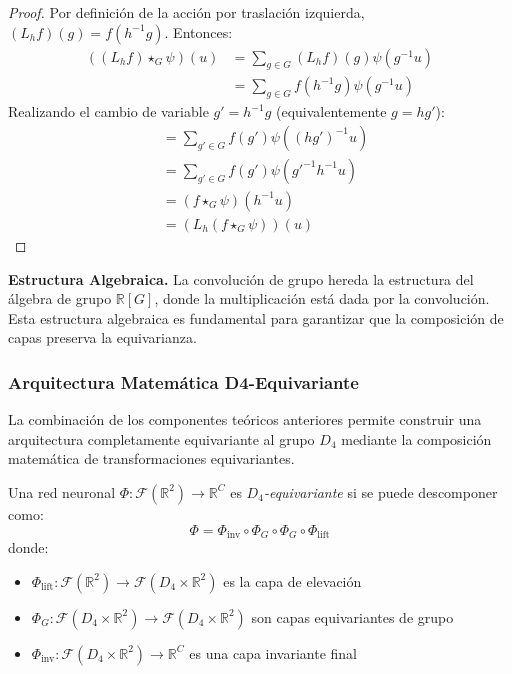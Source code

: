 \begin{proof}
Por definición de la acción por traslación izquierda, $(L_h f)(g) = f(h^{-1}g)$. Entonces:
\begin{align}
((L_h f) \star_G \psi)(u) &= \sum_{g \in G} (L_h f)(g) \psi(g^{-1}u) \\
&= \sum_{g \in G} f(h^{-1}g) \psi(g^{-1}u)
\end{align}
Realizando el cambio de variable $g' = h^{-1}g$ (equivalentemente $g = hg'$):
\begin{align}
&= \sum_{g' \in G} f(g') \psi((hg')^{-1}u) \\
&= \sum_{g' \in G} f(g') \psi(g'^{-1}h^{-1}u) \\
&= (f \star_G \psi)(h^{-1}u) \\
&= (L_h (f \star_G \psi))(u)
\end{align}
\end{proof}

\textbf{Estructura Algebraica.} La convolución de grupo hereda la estructura del álgebra de grupo $\mathbb{R}[G]$, donde la multiplicación está dada por la convolución. Esta estructura algebraica es fundamental para garantizar que la composición de capas preserva la equivarianza.

\subsubsection{Arquitectura Matemática D4-Equivariante}\label{subsubsec:arquitectura_d4_matematica}

La combinación de los componentes teóricos anteriores permite construir una arquitectura completamente equivariante al grupo $D_4$ mediante la composición matemática de transformaciones equivariantes.

\begin{definition}\label{def:red_d4_equivariante}
Una red neuronal $\Phi: \mathcal{F}(\mathbb{R}^2) \to \mathbb{R}^C$ es \textit{$D_4$-equivariante} si se puede descomponer como:
\begin{equation}
\Phi = \Phi_{\text{inv}} \circ \Phi_{G} \circ \Phi_{G} \circ \Phi_{\text{lift}}
\end{equation}
donde:
\begin{itemize}
    \item $\Phi_{\text{lift}}: \mathcal{F}(\mathbb{R}^2) \to \mathcal{F}(D_4 \times \mathbb{R}^2)$ es la capa de elevación
    \item $\Phi_{G}: \mathcal{F}(D_4 \times \mathbb{R}^2) \to \mathcal{F}(D_4 \times \mathbb{R}^2)$ son capas equivariantes de grupo
    \item $\Phi_{\text{inv}}: \mathcal{F}(D_4 \times \mathbb{R}^2) \to \mathbb{R}^C$ es una capa invariante final
\end{itemize}
\end{definition}

